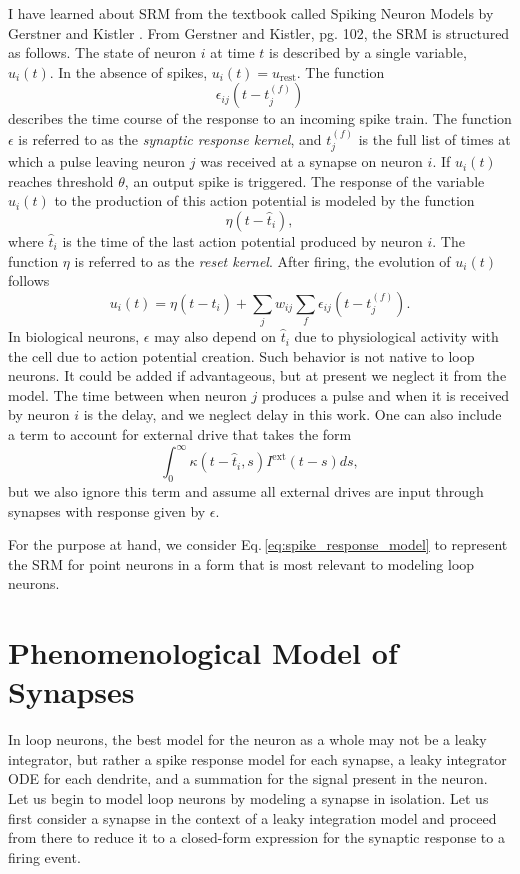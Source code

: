 \documentclass[]{article}
\begin{document}
I have learned about SRM from the textbook called Spiking Neuron Models by Gerstner and Kistler \cite{geki2002}. From Gerstner and Kistler, pg. 102, the SRM is structured as follows. The state of neuron $i$ at time $t$ is described by a single variable, $u_i(t)$. In the absence of spikes, $u_i(t) = u_{\mathrm{rest}}$. The function
\begin{equation}
\label{eq:synaptic_response_kernel}
\epsilon_{ij}(t-t_j^{(f)})
\end{equation}
describes the time course of the response to an incoming spike train. The function $\epsilon$ is referred to as the \textit{synaptic response kernel}, and $t_j^{(f)}$ is the full list of times at which a pulse leaving neuron $j$ was received at a synapse on neuron $i$. If $u_i(t)$ reaches threshold $\theta$, an output spike is triggered. The response of the variable $u_i(t)$ to the production of this action potential is modeled by the function
\begin{equation}
\label{eq:reset_kernel}
\eta(t-\hat{t}_i),
\end{equation}
where $\hat{t}_i$ is the time of the last action potential produced by neuron $i$. The function $\eta$ is referred to as the \textit{reset kernel}. After firing, the evolution of $u_i(t)$ follows
\begin{equation}
\label{eq:spike_response_model}
u_i(t) = \eta(t-\hat{t}_i)+\sum_j w_{ij}\sum_f \epsilon_{ij}(t-t_j^{(f)}).
\end{equation}
In biological neurons, $\epsilon$ may also depend on $\hat{t}_i$ due to physiological activity with the cell due to action potential creation. Such behavior is not native to loop neurons. It could be added if advantageous, but at present we neglect it from the model. The time between when neuron $j$ produces a pulse and when it is received by neuron $i$ is the delay, and we neglect delay in this work. One can also include a term to account for external drive that takes the form
\begin{equation}
\label{eq:external_drive}
\int_0^{\infty}\kappa(t-\hat{t}_i,s)I^{\mathrm{ext}}(t-s)ds,
\end{equation}
but we also ignore this term and assume all external drives are input through synapses with response given by $\epsilon$.

For the purpose at hand, we consider Eq.\,\ref{eq:spike_response_model} to represent the SRM for point neurons in a form that is most relevant to modeling loop neurons.

\section{\label{sec:synapses}Phenomenological Model of Synapses}
In loop neurons, the best model for the neuron as a whole may not be a leaky integrator, but rather a spike response model for each synapse, a leaky integrator ODE for each dendrite, and a summation for the signal present in the neuron. Let us begin to model loop neurons by modeling a synapse in isolation. Let us first consider a synapse in the context of a leaky integration model and proceed from there to reduce it to a closed-form expression for the synaptic response to a firing event. 
\end{document}
